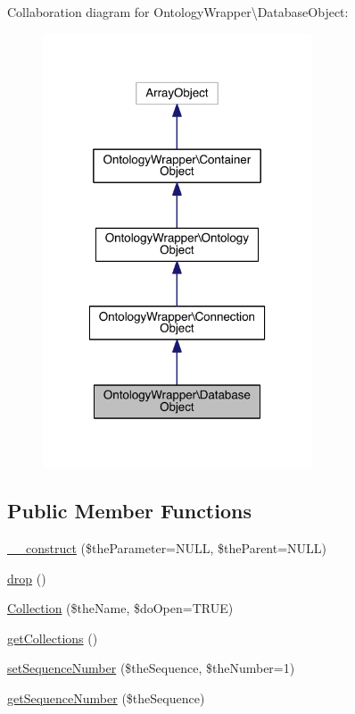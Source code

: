 Collaboration diagram for Ontology\-Wrapper\textbackslash{}Database\-Object\-:\nopagebreak
\begin{figure}[H]
\begin{center}
\leavevmode
\includegraphics[width=226pt]{class_ontology_wrapper_1_1_database_object__coll__graph}
\end{center}
\end{figure}
\subsection*{Public Member Functions}
\begin{DoxyCompactItemize}
\item 
\hyperlink{class_ontology_wrapper_1_1_database_object_a12746bd4b3a9a869544ccaa06cf3bf34}{\-\_\-\-\_\-construct} (\$the\-Parameter=N\-U\-L\-L, \$the\-Parent=N\-U\-L\-L)
\item 
\hyperlink{class_ontology_wrapper_1_1_database_object_a0a3f541e719b56e1191aaf75a0b58b03}{drop} ()
\item 
\hyperlink{class_ontology_wrapper_1_1_database_object_a7d4240910e47a255c80a08858a088c7e}{Collection} (\$the\-Name, \$do\-Open=T\-R\-U\-E)
\item 
\hyperlink{class_ontology_wrapper_1_1_database_object_a23409291f9aebd68da532a77c5143a84}{get\-Collections} ()
\item 
\hyperlink{class_ontology_wrapper_1_1_database_object_a4c7bd0ce9eb62750ef1c84351ed565cd}{set\-Sequence\-Number} (\$the\-Sequence, \$the\-Number=1)
\item 
\hyperlink{class_ontology_wrapper_1_1_database_object_ab731d606a297f2b1980f457efa1bc80d}{get\-Sequence\-Number} (\$the\-Sequence)
\end{DoxyCompactItemize}
